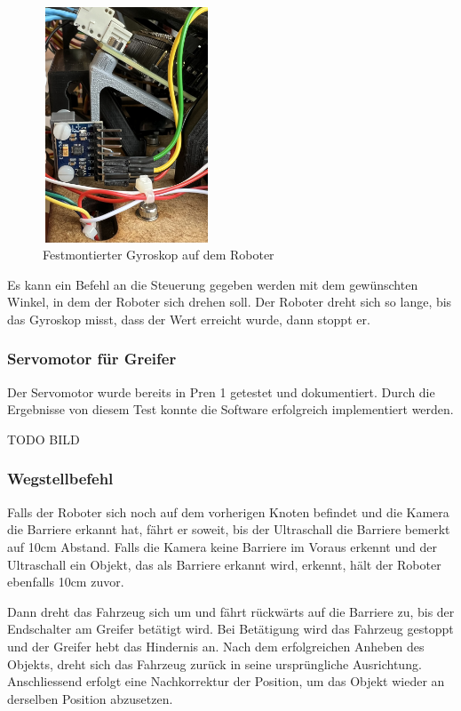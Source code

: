 \begin{figure}[H]
\centering
\includegraphics[width=5cm, height=7cm]{assets/ET/Gyroskop/Gyro_Montiert.jpeg}
\caption{Festmontierter Gyroskop auf dem Roboter}
\label{fig:Gyroskop auf dem Roboter}
\end{figure}

Es kann ein Befehl an die Steuerung gegeben werden mit dem gewünschten Winkel, in dem der Roboter sich drehen soll. Der Roboter dreht sich so lange, bis das Gyroskop misst, dass der Wert erreicht wurde, dann stoppt er.


\subsubsection{Servomotor für Greifer} 

Der Servomotor wurde bereits in Pren 1 getestet und dokumentiert. Durch die Ergebnisse von diesem Test konnte die Software erfolgreich implementiert werden.

TODO BILD

\subsubsection{Wegstellbefehl}

Falls der Roboter sich noch auf dem vorherigen Knoten befindet und die Kamera die Barriere erkannt hat, fährt er soweit, bis der Ultraschall die Barriere bemerkt auf 10cm Abstand. 
Falls die Kamera keine Barriere im Voraus erkennt und der Ultraschall ein Objekt, das als Barriere erkannt wird, erkennt, hält der Roboter ebenfalls 10cm zuvor.

Dann dreht das Fahrzeug sich um und fährt rückwärts auf die Barriere zu, bis der Endschalter am Greifer betätigt wird. Bei Betätigung wird das Fahrzeug gestoppt und der Greifer hebt das Hindernis an.
Nach dem erfolgreichen Anheben des Objekts, dreht sich das Fahrzeug zurück in seine ursprüngliche Ausrichtung. Anschliessend erfolgt eine Nachkorrektur der Position, um das Objekt wieder an derselben Position abzusetzen.

